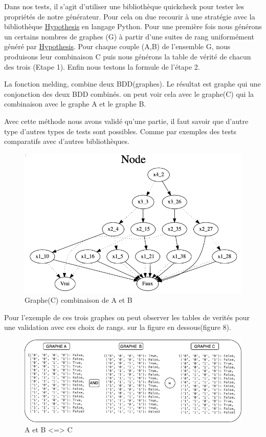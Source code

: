 \documentclass[french]{article}
\begin{document}
Dans nos tests, il s'agit d'utiliser une bibliothèque quickcheck pour tester les propriétés de notre générateur.
Pour cela on due recourir à une stratégie avec la bibliothèque \href{https://hypothesis.works}{Hypothesis} en langage Python.  Pour une première fois nous générons un certains nombres de graphes (G) à partir d'une suites de rang uniformément généré par \href{https://hypothesis.works}{Hypothesis}. Pour chaque couple (A,B) de l'ensemble G, nous produisons leur combinaison C puis nous générons la table de vérité de chacun des trois (Etape 1). Enfin nous testons la formule de l'étape 2.\medskip

La fonction melding, combine deux BDD(graphes). Le résultat est graphe qui  une conjonction des deux BDD combinés. on peut voir 
cela avec le graphe(C) qui la combinaison avec le graphe A et le graphe B.

Avec cette méthode nous avons validé qu'une partie, il faut savoir que d'autre type d'autres types de tests
sont possibles. Comme par exemples des tests comparatifs avec d'autres bibliothèques.

\begin{figure}[h!]
    \centering
    \includegraphics[scale=0.4]{abr_melding_C.png}
    \caption{Graphe(C) combinaison de A et B}
    \label{fig:graphe_B}
\end{figure}

Pour l'exemple de ces trois graphes on peut observer les tables de verités pour une validation avec ces choix de rangs. sur la figure en dessous(figure 8).

\begin{figure}[h!]
    \centering
    \includegraphics[scale=0.5]{and_ABC.png}
    \caption{A et B <=> C}
    \label{fig:and_abc}
\end{figure}
\end{document}
